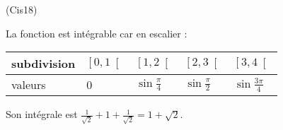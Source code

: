 \begin{tiny}(Cis18)\end{tiny}
La fonction est intégrable car en escalier :\smallskip
\begin{center}
\renewcommand{\arraystretch}{1.5}
\begin{tabular}{|l|l|l|l|l|} \hline
subdivision & $\left[0,1 \right[$ & $\left[1,2 \right[$ & $\left[2,3 \right[$ & $\left[3,4 \right[$ \\ \hline
valeurs & 0 & $\sin \frac{\pi}{4}$ & $\sin \frac{\pi}{2}$ & $\sin \frac{3\pi}{4}$ \\ \hline
\end{tabular}
\end{center}
Son intégrale est $\frac{1}{\sqrt{2}} + 1 + \frac{1}{\sqrt{2}}  = 1 + \sqrt{2}$.
